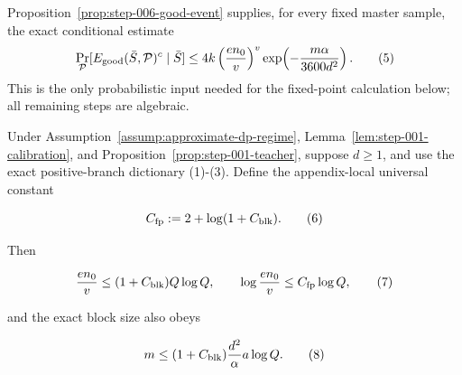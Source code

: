 Proposition~\ref{prop:step-006-good-event} supplies, for every fixed master
sample, the exact conditional estimate
\[
 \Pr_{\mathcal P}
 [E_{\rm good}(\bar S,\mathcal P)^c\mid\bar S]
 \le 4k\left(\frac{en_0}{v}\right)^v
 \exp\!\left(-\frac{m\alpha}{3600d^2}\right).
\tag{5}
\]
This is the only probabilistic input needed for the fixed-point calculation
below; all remaining steps are algebraic.



\begin{lemma}\label{lem:step-007-fixed-point}
Under Assumption~\ref{assump:approximate-dp-regime}, Lemma~\ref{lem:step-001-calibration}, and Proposition~\ref{prop:step-001-teacher}, suppose \(d\ge1\), and use the
exact positive-branch dictionary (1)-(3). Define the appendix-local
universal constant

\[
 C_{\rm fp}:=2+\log(1+C_{\rm blk}).
\tag{6}
\]

Then

\[
 \frac{en_0}{v}\le(1+C_{\rm blk})Q\log Q,
 \qquad
 \log\frac{en_0}{v}\le C_{\rm fp}\log Q,
\tag{7}
\]

and the exact block size also obeys

\[
 m\le(1+C_{\rm blk})
 \frac{d^2}{\alpha}a\log Q.
\tag{8}
\]


\end{lemma}

